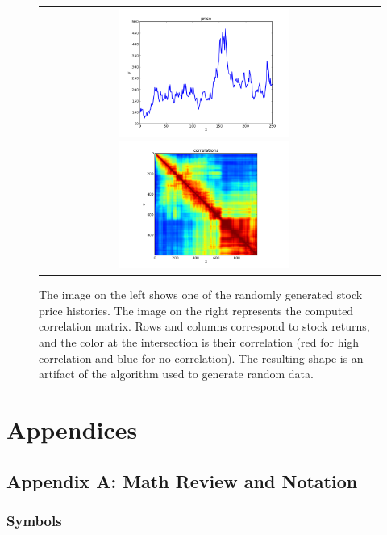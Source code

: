 \documentclass[justified,sixbynine]{tufte-book}
\theoremstyle{plain}%
\theoremstyle{definition}
\theoremstyle{remark}
\begin{document}
\begin{fullwidth}
\begin{figure}[ht]
\begin{tabular}{cc}
\includegraphics[width=2.2in]{images/price.png}
\includegraphics[width=2.2in]{images/cor.png}
\end{tabular}
\caption{The image on the left shows one of the randomly generated stock price histories. The image on the right represents the computed correlation matrix. Rows and columns correspond to stock returns, and the color at the intersection is their correlation (red for high correlation and blue for no correlation). The resulting shape is an artifact of the algorithm used to generate random data.\label{fig1}}
\end{figure}

\chapter{Appendices}

\goodbreak\section{Appendix A: Math Review and Notation}

\goodbreak\subsection{Symbols}


\end{fullwidth}
\end{document}
